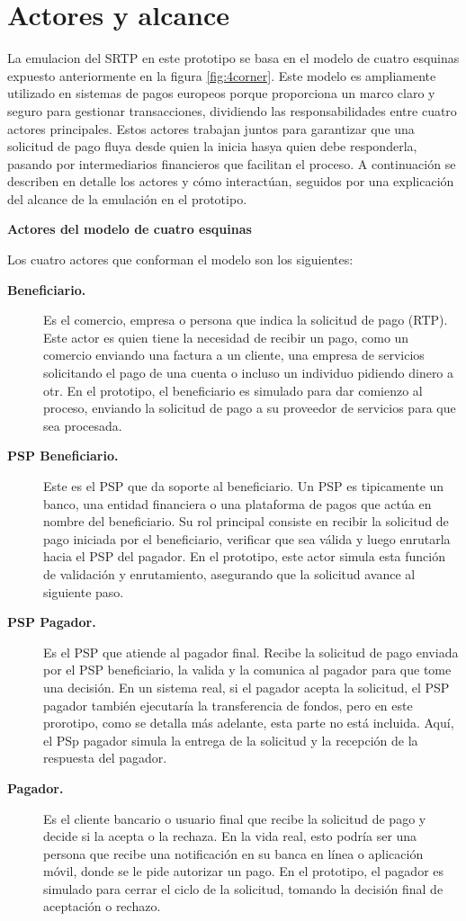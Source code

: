 \section{Actores y alcance}
\label{subsec:diseno_actores}

La emulacion del SRTP en este prototipo se basa en el modelo de cuatro esquinas expuesto anteriormente en la figura \ref{fig:4corner}. Este modelo es ampliamente utilizado en sistemas de pagos europeos porque proporciona un marco claro y seguro para gestionar transacciones, dividiendo las responsabilidades entre cuatro actores principales. Estos actores trabajan juntos para garantizar que una solicitud de pago fluya desde quien la inicia hasya quien debe responderla, pasando por intermediarios financieros que facilitan el proceso. A continuación se describen en detalle los actores y cómo interactúan, seguidos por una explicación del alcance de la emulación en el prototipo.

\textbf{Actores del modelo de cuatro esquinas}

Los cuatro actores que conforman el modelo son los siguientes:
\begin{description}
  \item[\textbf{Beneficiario.}]
  Es el comercio, empresa o persona que indica la solicitud de pago (RTP). Este actor es quien tiene la necesidad de recibir un pago, como un comercio enviando una factura a un cliente, una empresa de servicios solicitando el pago de una cuenta o incluso un individuo pidiendo dinero a otr. En el prototipo, el beneficiario es simulado para dar comienzo al proceso, enviando la solicitud de pago a su proveedor de servicios para que sea procesada.
  \item[\textbf{PSP Beneficiario.}]
  Este es el PSP que da soporte al beneficiario. Un PSP es tipicamente un banco, una entidad financiera o una plataforma de pagos que actúa en nombre del beneficiario. Su rol principal consiste en recibir la solicitud de pago iniciada por el beneficiario, verificar que sea válida y luego enrutarla hacia el PSP del pagador. En el prototipo, este actor simula esta función de validación y enrutamiento, asegurando que la solicitud avance al siguiente paso.
  \item[\textbf{PSP Pagador.}]
  Es el PSP que atiende al pagador final. Recibe la solicitud de pago enviada por el PSP beneficiario, la valida y la comunica al pagador para que tome una decisión. En un sistema real, si el pagador acepta la solicitud, el PSP pagador también ejecutaría la transferencia de fondos, pero en este prorotipo, como se detalla más adelante, esta parte no está incluida. Aquí, el PSp pagador simula la entrega de la solicitud y la recepción de la respuesta del pagador.
  \item[\textbf{Pagador.}]
  Es el cliente bancario o usuario final que recibe la solicitud de pago y decide si la acepta o la rechaza. En la vida real, esto podría ser una persona que recibe una notificación en su banca en línea o aplicación móvil, donde se le pide autorizar un pago. En el prototipo, el pagador es simulado para cerrar el ciclo de la solicitud, tomando la decisión final de aceptación o rechazo.
\end{description}

